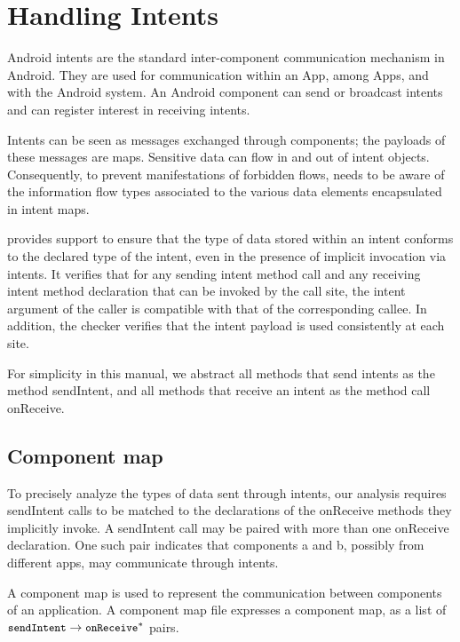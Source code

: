 \htmlhr

\newcommand{\app}{App\xspace}
\newcommand{\apps}{\app{}s\xspace}
\newcommand{\tp}[1]{\mathit{typeof}}
\newcommand{\Fix}[1]{\textbf{[[}{\color{red} #1}\textbf{]]}}


\chapter{Handling Intents\label{intent-checker}}

Android intents are the standard inter-component communication
mechanism in Android.  They are used for communication within an \app,
among \apps, and with the Android system.  An Android component can
send or broadcast intents and can register interest in receiving
intents.

Intents can be seen as messages exchanged through components; the
payloads of these messages are maps.  Sensitive data can flow in and
out of intent objects.  Consequently, to prevent manifestations of
forbidden flows, \theFlowChecker{} needs to be aware of the
information flow types associated to the various data elements
encapsulated in intent maps.

\TheFlowChecker{} provides support to
ensure that the type of data stored within an intent conforms to the
declared type of the intent, even in the presence of implicit
invocation via intents.  It verifies that for any sending intent
method call and any receiving intent method declaration that can be
invoked by the call site, the intent argument of the caller is
compatible with that of the corresponding callee.  In addition, the
checker verifies that the intent payload is used consistently at each
site.

For simplicity in this manual, we abstract all methods that send intents as the
method sendIntent, and all methods that receive an intent as the method call
onReceive.

\section{Component map}
To precisely analyze the types of data sent through intents, our analysis
requires sendIntent calls to be matched to the declarations of the onReceive
methods they implicitly invoke. A sendIntent call may be paired
with more than one onReceive declaration. One such pair indicates that 
components a and b, possibly from different apps, may communicate through 
intents. 

A component map is used to represent the communication between components of an
application. A component map file expresses a 
component map, as a list of $\flow{\|sendIntent|}{\|onReceive|^*}$ pairs.

